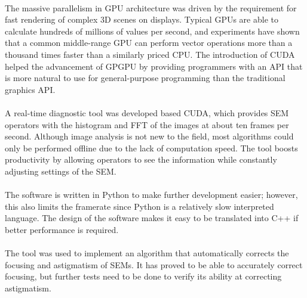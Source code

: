 \documentclass[12pt, twocolumn]{report}
\begin{document}
\paragraph{}
The massive parallelism in GPU architecture was driven by the requirement for fast rendering of complex 3D scenes on displays. Typical GPUs are able to calculate hundreds of millions of values per second, and experiments have shown that a common middle-range GPU can perform vector operations more than a thousand times faster than a similarly priced CPU. The introduction of CUDA helped the advancement of GPGPU by providing programmers with an API that is more natural to use for general-purpose programming than the traditional graphics API.

\paragraph{}
A real-time diagnostic tool was developed based CUDA, which provides SEM operators with the histogram and FFT of the images at about ten frames per second. Although image analysis is not new to the field, most algorithms could only be performed offline due to the lack of computation speed. The tool boosts productivity by allowing operators to see the information while constantly adjusting settings of the SEM.

\paragraph{}
The software is written in Python to make further development easier; however, this also limits the framerate since Python is a relatively slow interpreted language. The design of the software makes it easy to be translated into C++ if better performance is required.

\paragraph{}
The tool was used to implement an algorithm that automatically corrects the focusing and astigmatism of SEMs. It has proved to be able to accurately correct focusing, but further tests need to be done to verify its ability at correcting astigmatism.
\end{document}
